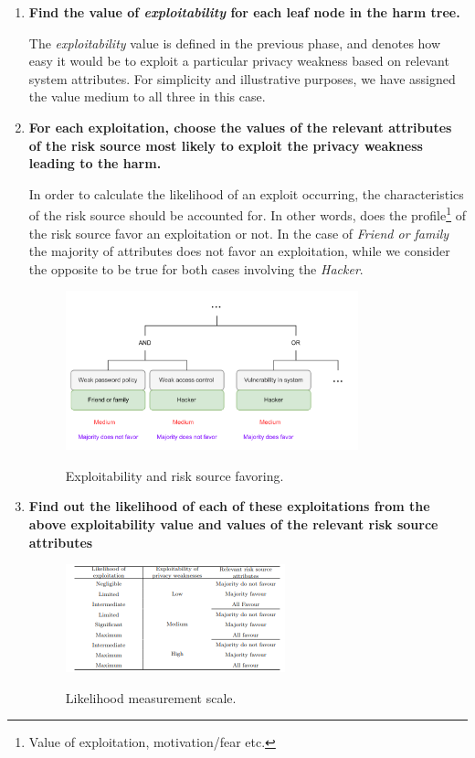 \begin{enumerate}
  \item{\textbf{Find the value of \textit{exploitability} for each leaf node in the harm tree.}}

       The \textit{exploitability} value is defined in the previous phase, and
       denotes how easy it would be to exploit a particular privacy weakness based on
       relevant system attributes. For simplicity and illustrative purposes,
       we have assigned the value medium to all three in this case.

  \item{\textbf{For each exploitation, choose the values of the relevant attributes of
        the risk source most likely to exploit the privacy weakness leading to the
        harm.}}

        In order to calculate the likelihood of an exploit occurring, the
        characteristics of the risk source should be accounted for. In other words, does
        the profile\footnote{Value of exploitation, motivation/fear etc.} of the risk
        source favor an exploitation or not. In the case of \textit{Friend or family}
        the majority of attributes does not favor an exploitation, while we
        consider the opposite to be true for both cases involving the \textit{Hacker}.

        \begin{figure}[hbt!]
          \centering
          \includegraphics[width=0.8\textwidth]{pictures/step2.png}
          \caption{}{Exploitability and risk source favoring.}
          \label{fig:favor}
        \end{figure}

  \item{\textbf{Find out the likelihood of each of these exploitations from the above
        exploitability value and values of the relevant risk source attributes}}

        \begin{figure}[hbt!]
          \centering
          \includegraphics[width=0.6\textwidth]{pictures/measurement.png}
          \caption{}{Likelihood measurement scale.}
          \label{fig:measurement}
        \end{figure}


\end{enumerate}

